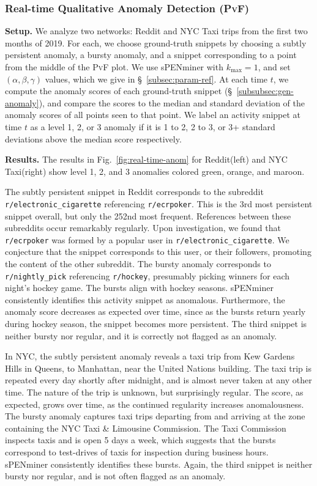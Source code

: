 \documentclass[sigconf]{acmart}
\newcommand{\pf}{\textsc{PvF}\xspace}
\newcommand{\methodOnline}{sPENminer\xspace}
\newcommand{\timestamp}{t}
\newcommand{\patternSize}{k}
\newcommand{\maxSize}{\patternSize_{\max}}
\newcommand{\wExp}{\alpha}
\newcommand{\fExp}{\beta}
\newcommand{\sExp}{\gamma}
\newcommand{\NYC}{NYC Taxi\xspace}
\newcommand{\reddit}{Reddit\xspace}
\newcommand{\odds}{\texttt{\small r/nightly\_pick}\xspace}
\newcommand{\hockey}{\texttt{\small r/hockey}\xspace}
\newcommand{\cig}{\texttt{\small r/electronic\_cigarette}\xspace}
\newcommand{\poker}{\texttt{\small r/ecrpoker}\xspace}
\begin{document}
\subsubsection{Real-time Qualitative Anomaly Detection (\pf)}
\label{subsubsec:realtime-PvF}

\textbf{Setup.} We analyze two networks: \reddit and \NYC trips from the first two months of 2019. For each, we choose ground-truth snippets by choosing a subtly persistent anomaly, a bursty anomaly, and a snippet corresponding to a point from the middle of the \pf plot. We use \methodOnline with $\maxSize = 1$, and set $(\wExp, \fExp, \sExp)$ values, which we give in \S~\ref{subsec:param-ref}. At each time $\timestamp$, we compute the anomaly scores of each ground-truth snippet (\S~\ref{subsubsec:gen-anomaly}), and
compare the scores to the median and standard deviation of the anomaly scores of all points seen to that point. We label an activity snippet at time $\timestamp$ as a level 1, 2, or 3 anomaly if it is 1 to 2, 2 to 3, or 3+ standard deviations above the median score respectively.


\vspace{0.1cm}
\noindent \textbf{Results.} The results in Fig.~\ref{fig:real-time-anom} for \reddit (left) and \NYC (right) show level 1, 2, and 3 anomalies colored green, orange, and maroon. 

The subtly persistent snippet in \reddit corresponds to the subreddit \cig referencing \poker. This is the 3rd most persistent snippet overall, but only the 252nd most frequent. References between these subreddits occur remarkably regularly. Upon investigation, we found that \poker was formed by a popular user in \cig. We conjecture that the snippet corresponds to this user, or their followers, promoting the content of the other subreddit. 
The bursty anomaly corresponds to \odds referencing \hockey, presumably picking winners for each night's hockey game. The bursts align with hockey seasons. \methodOnline consistently identifies this activity snippet as anomalous. Furthermore, the anomaly score decreases as expected over time, since as the bursts return yearly during hockey season, the snippet becomes more persistent. 
The third snippet is neither bursty nor regular, and it is correctly not flagged as an anomaly.

In NYC, 
the subtly persistent anomaly reveals a taxi trip from Kew Gardens Hills in Queens, to Manhattan, near the United Nations building. The taxi trip is repeated every day shortly after midnight, and is almost never taken at any other time. The nature of the trip is unknown, but surprisingly regular. The score, as expected, grows over time, as the continued regularity increases anomalousness. 
The bursty anomaly captures taxi trips departing from and arriving at the zone containing the NYC Taxi \& Limousine Commission. The Taxi Commission inspects taxis and is open 5 days a week, which suggests that the bursts correspond to test-drives of taxis for inspection during business hours. \methodOnline consistently identifies these bursts. 
Again, the third snippet is neither bursty nor regular, and is not often flagged as an anomaly.
\end{document}
